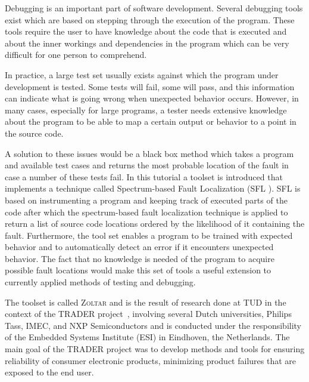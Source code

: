 
Debugging is an important part of software development.
Several debugging tools exist which are based on stepping through the execution of the program.
These tools require the user to have knowledge about the code that is executed and 
about the inner workings and dependencies in the program 
which can be very difficult for one person to comprehend.

In practice, a large test set usually exists against which the program under development is tested.
Some tests will fail, some will pass, and this information can indicate what is going wrong
when unexpected behavior occurs.
However, in many cases, especially for large programs, 
a tester needs extensive knowledge about the program to be able to 
map a certain output or behavior to a point in the source code.


A solution to these issues would be a black box method 
which takes a program and available test cases 
and returns the most probable location of the fault
in case a number of these tests fail.
In this tutorial a toolset is introduced that implements
a technique called Spectrum-based Fault Localization (SFL \cite{sfltaicpart}).
SFL is based on instrumenting a program and keeping track of executed parts of the code
after which the spectrum-based fault localization technique is applied to 
return a list of source code locations ordered by the likelihood of it containing the fault.
Furthermore, the tool set enables a program to be trained with expected behavior
and to automatically detect an error if it encounters unexpected behavior.
The fact that no knowledge is needed of the program to acquire possible fault locations
would make this set of tools a useful extension to 
currently applied methods of testing and debugging.

The toolset is called \textsc{Zoltar}
and is the result of research done at TUD in the context
of the TRADER project~\cite{trader},
involving several Dutch universities, Philips Tass, IMEC, and NXP
Semiconductors and is conducted under the
responsibility of the Embedded Systems Institute (ESI) in Eindhoven, the
Netherlands. The main goal of the
TRADER project was to develop methods and tools for ensuring reliability
of consumer electronic
products, minimizing product failures that are exposed to the end user.

